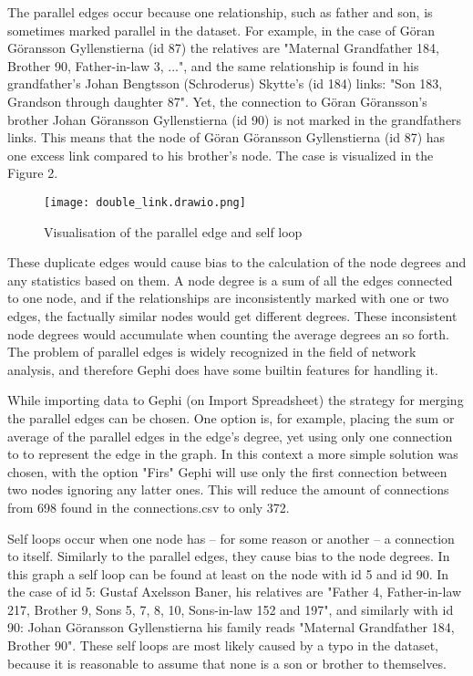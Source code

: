 The parallel edges occur because one relationship, such as father and son, is sometimes marked parallel in the dataset. For example, in the case of Göran Göransson Gyllenstierna (id 87) the relatives are "Maternal Grandfather 184, Brother 90, Father-in-law 3, ...", and the same relationship is found in his grandfather's Johan Bengtsson (Schroderus) Skytte's (id 184) links: "Son 183, Grandson through daughter 87". Yet, the connection to Göran Göransson's brother Johan Göransson Gyllenstierna (id 90) is not marked in the grandfathers links. This means that the node of Göran Göransson Gyllenstierna (id 87) has one excess link compared to his brother's node. The case is visualized in the Figure 2.

\begin{figure}[h]
	\texttt{[image: double\_link.drawio.png]}
	\centering
	\caption{Visualisation of the parallel edge and self loop} 
	\centering
\end{figure}

These duplicate edges would cause bias to the calculation of the node degrees and any statistics based on them. A node degree is a sum of all the edges connected to one node, and if the relationships are inconsistently marked with one or two edges, the factually similar nodes would get different degrees. These inconsistent node degrees would accumulate when counting the average degrees an so forth. The problem of parallel edges is widely recognized in the field of network analysis, and therefore Gephi does have some builtin features for handling it.

While importing data to Gephi (on Import Spreadsheet) the strategy for merging the parallel edges can be chosen. One option is, for example, placing the sum or average of the parallel edges in the edge's degree, yet using only one connection to to represent the edge in the graph. In this context a more simple solution was chosen, with the option "Firs" Gephi will use only the first connection between two nodes ignoring any latter ones. This will reduce the amount of connections from 698 found in the connections.csv to only 372.

Self loops occur when one node has – for some reason or another – a connection to itself. Similarly to the parallel edges, they cause bias to the node degrees. In this graph a self loop can be found at least on the node with id 5 and id 90. In the case of id 5: Gustaf Axelsson Baner, his relatives are "Father 4, Father-in-law 217, Brother 9, Sons 5, 7, 8, 10, Sons-in-law 152 and 197", and similarly with id 90: Johan Göransson Gyllenstierna his family reads "Maternal Grandfather 184, Brother 90". These self loops are most likely caused by a typo in the dataset, because it is reasonable to assume that none is a son or brother to themselves.
 
